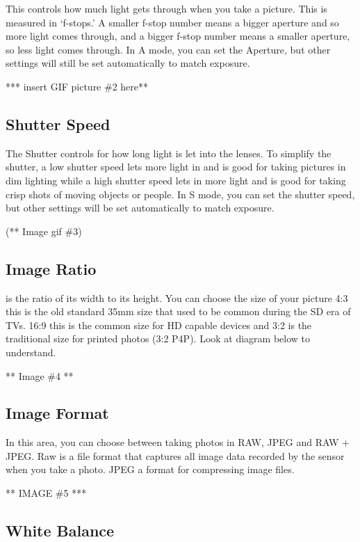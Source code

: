 \documentclass[
]{book}
\begin{document}
This controls how much light gets through when you take a picture. This is measured in `f-stops.' A smaller f-stop number means a bigger aperture and so more light comes through, and a bigger f-stop number means a smaller aperture, so less light comes through. In A mode, you can set the Aperture, but other settings will still be set automatically to match exposure.

*** insert GIF picture \#2 here**

\hypertarget{shutter-speed}{%
\subsection{Shutter Speed}\label{shutter-speed}}

The Shutter controls for how long light is let into the lenses. To simplify the shutter, a low shutter speed lets more light in and is good for taking pictures in dim lighting while a high shutter speed lets in more light and is good for taking crisp shots of moving objects or people. In S mode, you can set the shutter speed, but other settings will be set automatically to match exposure.

(** Image gif \#3)

\hypertarget{image-ratio}{%
\subsection{Image Ratio}\label{image-ratio}}

is the ratio of its width to its height. You can choose the size of your picture 4:3 this is the old standard 35mm size that used to be common during the SD era of TVs. 16:9 this is the common size for HD capable devices and 3:2 is the traditional size for printed photos (3:2 P4P). Look at diagram below to understand.

** Image \#4 **

\hypertarget{image-format}{%
\subsection{Image Format}\label{image-format}}

In this area, you can choose between taking photos in RAW, JPEG and RAW + JPEG. Raw is a file format that captures all image data recorded by the sensor when you take a photo. JPEG a format for compressing image files.

** IMAGE \#5 ***

\hypertarget{white-balance}{%
\subsection{White Balance}\label{white-balance}}
\end{document}
